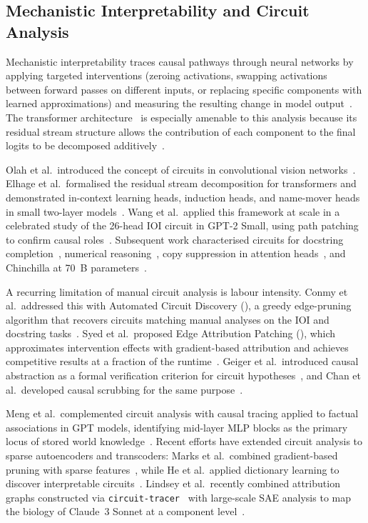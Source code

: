 
\subsection{Mechanistic Interpretability and Circuit Analysis}

Mechanistic interpretability traces causal pathways through neural networks by
applying targeted interventions (zeroing activations, swapping activations between
forward passes on different inputs, or replacing specific components with learned
approximations) and measuring the resulting change in model output~\cite{Pearl2009,
Geiger2021}. The transformer architecture~\cite{Vaswani2017} is especially amenable to
this analysis because its residual stream structure allows the contribution of each
component to the final logits to be decomposed additively~\cite{Elhage2021}.

Olah et al.\ introduced the concept of circuits in convolutional vision
networks~\cite{Olah2020,Cammarata2020}. Elhage et al.\ formalised the residual stream
decomposition for transformers and demonstrated in-context learning heads, induction
heads, and name-mover heads in small two-layer models~\cite{Elhage2021}. Wang et al.\
applied this framework at scale in a celebrated study of the 26-head IOI circuit
in GPT-2 Small, using path patching to confirm causal roles~\cite{Wang2022}. Subsequent
work characterised circuits for docstring completion~\cite{Heimersheim2023},
numerical reasoning~\cite{Hanna2023}, copy suppression in attention
heads~\cite{McDougall2023}, and Chinchilla at 70~B
parameters~\cite{Lieberum2023}.

A recurring limitation of manual circuit analysis is labour intensity. Conmy et al.\
addressed this with Automated Circuit Discovery (\ACDC), a greedy edge-pruning
algorithm that recovers circuits matching manual analyses on the IOI and docstring
tasks~\cite{Conmy2023}. Syed et al.\ proposed Edge Attribution Patching (\EAP), which
approximates intervention effects with gradient-based attribution and achieves
competitive results at a fraction of the runtime~\cite{Syed2023}. Geiger et al.\
introduced causal abstraction as a formal verification criterion for circuit
hypotheses~\cite{Geiger2021}, and Chan et al.\ developed causal scrubbing for
the same purpose~\cite{Chan2022}.

Meng et al.\ complemented circuit analysis with causal tracing applied to factual
associations in GPT models, identifying mid-layer MLP blocks as the primary locus of
stored world knowledge~\cite{Meng2022}. Recent efforts have extended circuit analysis
to sparse autoencoders and transcoders: Marks et al.\ combined gradient-based pruning
with sparse features~\cite{marks2024sparse}, while He et al.\ applied dictionary
learning to discover interpretable circuits~\cite{He2024}. Lindsey et al.\ recently
combined attribution graphs constructed via \texttt{circuit-tracer}~\cite{Anthropic2025CT}
with large-scale SAE analysis to map the biology of Claude~3 Sonnet at a component
level~\cite{Lindsey2025}.


